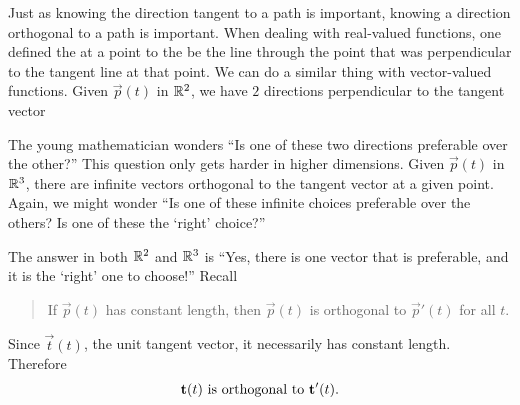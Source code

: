 \documentclass{ximera}
\begin{document}
Just as knowing the direction tangent to a path is important, knowing
a direction orthogonal to a path is important. When dealing with
real-valued functions, one defined the  at a point to
the be the line through the point that was perpendicular to the
tangent line at that point. We can do a similar thing with
vector-valued functions. Given $\vec{p}(t)$ in $\mathbb R^2$, we have $2$
directions perpendicular to the tangent vector
\begin{image}
\end{image}
The young mathematician wonders ``Is one of these two directions
preferable over the other?''  This question only gets harder in higher
dimensions.  Given $\vec{p}(t)$ in $\mathbb R^3$, there are infinite vectors
orthogonal to the tangent vector at a given point. Again, we might
wonder ``Is one of these infinite choices preferable over the others?
Is one of these the `right' choice?''

The answer in both $\mathbb R^2$ and $\mathbb R^3$ is ``Yes, there is one vector
that is preferable, and it is the `right' one to choose!'' Recall
\begin{quote}
If $\vec{p}(t)$ has constant length, then $\vec{p}(t)$ is orthogonal
to $\vec{p}'(t)$ for all $t$.
\end{quote}
Since $\vec{t}(t)$, the unit tangent vector, it necessarily has
constant length. Therefore
\[\index{vector-valued function!of constant length}
\vec{t}(t)\text{ is orthogonal to }\vec{t}'(t).
\]
\end{document}
